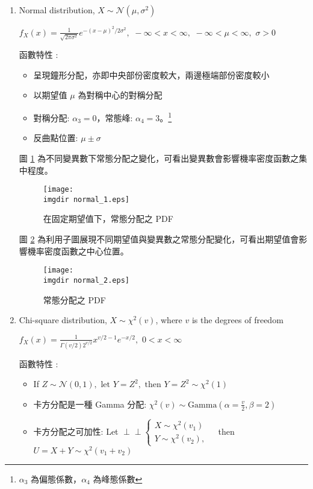 \begin{enumerate}
\item
Normal distribution, $X \sim \mathcal{N}(\mu, \sigma^2)$ 
\vspace{0.2cm}

$\displaystyle f_X(x) = \frac{1}{\sqrt{2\pi \sigma^2}}e^{-(x-\mu)^2/2\sigma^2}, \,\,-\infty < x < \infty,\,\, -\infty < \mu < \infty,\,\, \sigma > 0$
\vspace{0.2cm}

函數特性 : 
\begin{itemize}
\item
呈現鐘形分配，亦即中央部份密度較大，兩邊極端部份密度較小
\item
以期望值 $\mu$ 為對稱中心的對稱分配
\item
對稱分配: $\alpha_3 = 0$，常態峰: $\alpha_4 = 3$。\footnote{$\alpha_3$ 為偏態係數，$\alpha_4$ 為峰態係數} 
\item
反曲點位置: $\mu \pm \sigma$
\end{itemize}

圖 \ref{fig:normal_1} 為不同變異數下常態分配之變化，可看出變異數會影響機率密度函數之集中程度。
\bigskip
\begin{figure}[H]
    \centering
        \texttt{[image: \\imgdir normal\_1.eps]}
    \caption{在固定期望值下，常態分配之 PDF}
    \label{fig:normal_1}
\end{figure}

圖 \ref{fig:normal_2} 為利用子圖展現不同期望值與變異數之常態分配變化，可看出期望值會影響機率密度函數之中心位置。
\bigskip
\begin{figure}[H]
    \centering
        \texttt{[image: \\imgdir normal\_2.eps]}
    \caption{常態分配之 PDF}
    \label{fig:normal_2}
\end{figure}
\newpage
\item
Chi-square distribution, $X \sim \chi^2(v)$, where $v$ is the degrees of freedom 
\vspace{0.2cm}

$\displaystyle f_X(x) = \frac{1}{\Gamma(v/2)2^{v/2}}x^{v/2 - 1}e^{-x/2},\,\, 0 < x < \infty$
\vspace{0.2cm}

函數特性 : 
\begin{itemize}
\item
If $Z \sim \mathcal{N}(0, 1),\,\, \text{let}\,\, Y = Z^2,\,\, \text{then}\,\, Y = Z^2 \sim \chi^2(1)$
\item
卡方分配是一種 Gamma 分配: $\chi^2(v) \sim \text{Gamma}(\alpha = \displaystyle \frac{v}{2}, \beta = 2)$
\item
卡方分配之可加性: Let $\!\perp\!\!\!\perp 
\left\{\begin{array}{ll} 
X \sim \chi^2(v_1) &\\ 
Y \sim \chi^2(v_2), &
\end{array}\right.$ then $U = X + Y \sim \chi^2(v_1 + v_2)$ 
\end{itemize}


\end{enumerate}
